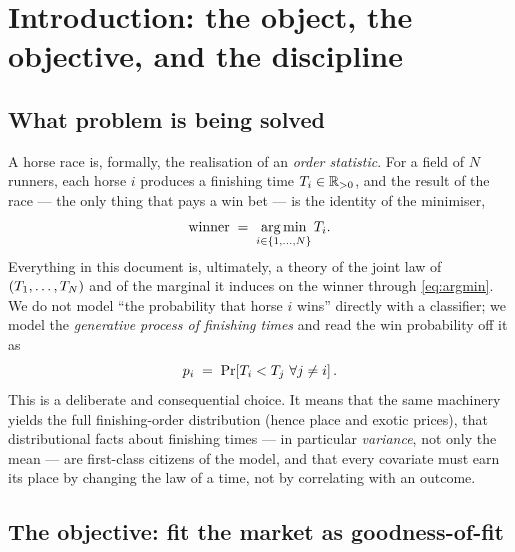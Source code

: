\chapter{Introduction: the object, the objective, and the discipline}
\label{ch:intro}

\section{What problem is being solved}

A horse race is, formally, the realisation of an \emph{order statistic}. For a field of $N$
runners, each horse $i$ produces a finishing time $T_i\in\mathbb{R}_{>0}$, and the result of the
race --- the only thing that pays a win bet --- is the identity of the minimiser,
\begin{equation}
  \text{winner} \;=\; \operatorname*{arg\,min}_{i\in\{1,\dots,N\}} T_i .
  \label{eq:argmin}
\end{equation}
Everything in this document is, ultimately, a theory of the joint law of
$(T_1,\dots,T_N)$ and of the marginal it induces on the winner through
\eqref{eq:argmin}. We do not model ``the probability that horse $i$ wins'' directly with a
classifier; we model the \emph{generative process of finishing times} and read the win
probability off it as
\begin{equation}
  p_i \;=\; \Pr\!\left[\Tfin_i < \Tfin_j \ \forall j\neq i\right].
  \label{eq:winprob}
\end{equation}
This is a deliberate and consequential choice. It means that the same machinery yields the full
finishing-order distribution (hence place and exotic prices), that distributional facts about
finishing times --- in particular \emph{variance}, not only the mean --- are first-class
citizens of the model, and that every covariate must earn its place by changing the law of a
time, not by correlating with an outcome.

\section{The objective: fit the market as goodness-of-fit}


